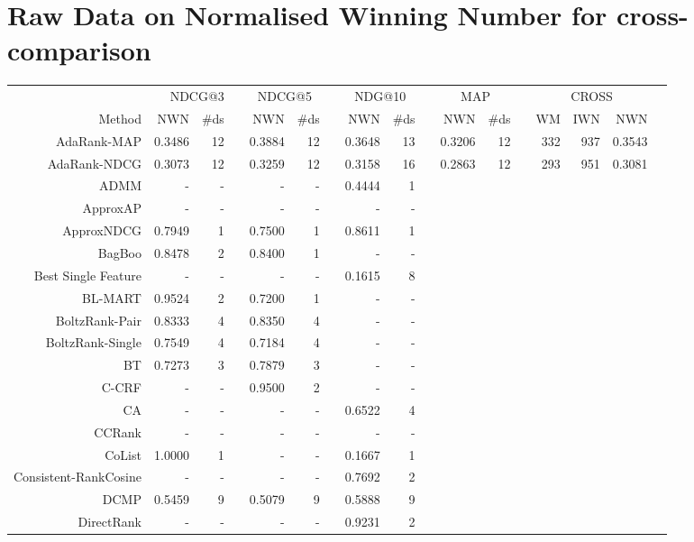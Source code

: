 \documentclass{sig-alternate-2013}
\begin{document}
\section{Raw Data on Normalised Winning Number for cross-comparison}
\label{app:norm_winnum_all}
\onecolumn
\begin{longtable}{@{}rrrrrrrrrrrrrrrrr@{}}\toprule
& \multicolumn{2}{p{0.5cm}}{NDCG@3} & \phantom{a} 
& \multicolumn{2}{c}{NDCG@5} & \phantom{a} 
& \multicolumn{2}{c}{NDG@10} & \phantom{a} 
& \multicolumn{2}{c}{MAP}    & \phantom{a}
& \multicolumn{3}{c}{CROSS}\\
\cmidrule{2-3} \cmidrule{5-6} \cmidrule{8-9} \cmidrule{11-12} \cmidrule{14-16}
Method & NWN & \#ds && NWN & \#ds && NWN & \#ds && NWN & \#ds && WM & IWN & NWN \\ \midrule
AdaRank-MAP & 0.3486 & 12 && 0.3884 & 12 && 0.3648 & 13 && 0.3206 & 12 && 332 & 937 & 0.3543 \\
AdaRank-NDCG & 0.3073 & 12 && 0.3259 & 12 && 0.3158 & 16 && 0.2863 & 12 && 293 & 951 & 0.3081 \\
ADMM & - & - && - & - && 0.4444 & 1 && & && & & \\
ApproxAP & - & - && - & - && - & - && & && & & \\
ApproxNDCG & 0.7949 & 1 && 0.7500 & 1 && 0.8611 & 1 && & && & & \\
BagBoo & 0.8478 & 2 && 0.8400 & 1 && - & - && & && & & \\
Best Single Feature & - & - && - & - && 0.1615 & 8 && & && & & \\
BL-MART & 0.9524 & 2 && 0.7200 & 1 && - & - && & && & & \\
BoltzRank-Pair & 0.8333 & 4 && 0.8350 & 4 && - & - && & && & & \\
BoltzRank-Single & 0.7549 & 4 && 0.7184 & 4 && - & - && & && & & \\
BT & 0.7273 & 3 && 0.7879 & 3 && - & - && & && & & \\
C-CRF & - & - && 0.9500 & 2 && - & - && & && & & \\
CA & - & - && - & - && 0.6522 & 4 && & && & & \\
CCRank & - & - && - & - && - & - && & && & & \\
CoList & 1.0000 & 1 && - & - && 0.1667 & 1 && & && & & \\
Consistent-RankCosine & - & - && - & - && 0.7692 & 2 && & && & & \\
DCMP & 0.5459 & 9 && 0.5079 & 9 && 0.5888 & 9 && & && & & \\
DirectRank & - & - && - & - && 0.9231 & 2 && & && & & \\

\end{longtable}
\end{document}
